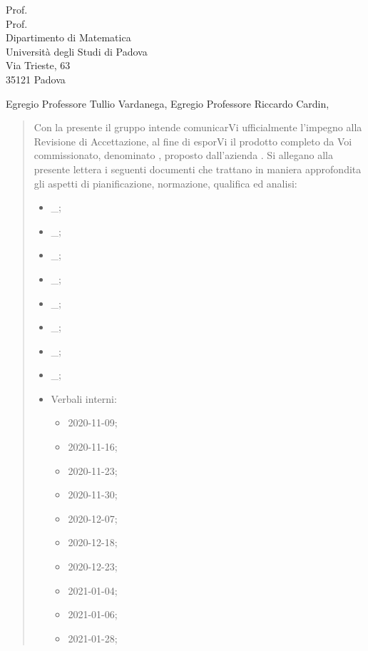 \documentclass[a4paper,12pt]{letteracdp}
\date{26 maggio 2021}
\begin{document}
\thispagestyle{empty}

\begin{letter}{
	Prof. \Tullio{} \\
	Prof. \Riccardo{} \\
	Dipartimento di Matematica \\
	Università degli Studi di Padova \\
	Via Trieste, 63 \\
	35121 Padova}
	
\opening{Egregio Professore Tullio Vardanega, \newline
Egregio Professore Riccardo Cardin,}

\begin{quotation}
	\noindent 
	Con la presente il gruppo \gruppo{} intende comunicarVi ufficialmente l'impegno alla Revisione di Accettazione, al fine di esporVi il prodotto completo da Voi commissionato, denominato \progetto{}, proposto dall’azienda \proponente.\newline
	Si allegano alla presente lettera i seguenti documenti che trattano in maniera approfondita gli aspetti di pianificazione, normazione, qualifica ed analisi:
	\begin{itemize}
		\item \docAdR{}\_\versAdR;
		\item \docG{}\_\versGlo;
		\item \docNdP{}\_\versNdP;
		\item \docPdP{}\_\versPdP;
		\item \docPdQ{}\_\versPdQ;
		\item \docMU{}\_\versMU;
		\item \docMS{}\_\versMS;
		\item \docSdF{}\_\versSdF;
		\item Verbali interni:
		\begin{itemize}
			\item \docVI{}2020-11-09;
			\item \docVI{}2020-11-16;
			\item \docVI{}2020-11-23;
			\item \docVI{}2020-11-30;
			\item \docVI{}2020-12-07;
			\item \docVI{}2020-12-18;
			\item \docVI{}2020-12-23;
			\item \docVI{}2021-01-04;
			\item \docVI{}2021-01-06;
			\item \docVI{}2021-01-28;

\end{itemize}
\end{itemize}
\end{quotation}
\end{letter}
\end{document}
